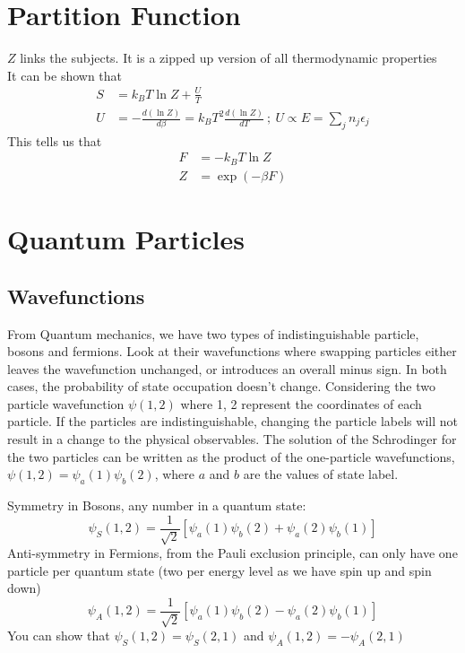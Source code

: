 \documentclass[a4paper, 11pt, normalem]{report}
\begin{document}
\section{Partition Function}
$Z$ links the subjects. It is a zipped up version of all thermodynamic properties \\
It can be shown that
\begin{align*}
    S &= k_B T\ln Z + \frac{U}{T} \\
    U &= -\frac{d(\ln Z)}{d\beta} = k_B T^2 \frac{d(\ln Z)}{dT} ~;~ U \propto E = \sum_{j} n_j \epsilon_j
\end{align*}
This tells us that
\begin{align*}
    F &= -k_B T\ln Z \\
    Z &= \exp(-\beta F)
\end{align*}

\section{Quantum Particles}

\subsection{Wavefunctions}
From Quantum mechanics, we have two types of indistinguishable particle, bosons and fermions.
Look at their wavefunctions where swapping particles either leaves the wavefunction unchanged, or introduces an overall minus sign.
In both cases, the probability of state occupation doesn't change. Considering the two particle wavefunction $\psi(1,2)$ where 1, 2 represent the coordinates of each particle.
If the particles are indistinguishable, changing the particle labels will not result in a change to the physical observables.
The solution of the Schrodinger for the two particles can be written as the product of the one-particle wavefunctions, $\psi(1,2) = \psi_{a}(1)\psi_{b}(2)$, where $a$ and $b$ are the values of state label.

Symmetry in Bosons, any number in a quantum state:
\begin{equation*}
    \psi_S (1,2) = \frac{1}{\sqrt{2}}[\psi_a(1)\psi_b(2) + \psi_a(2)\psi_b(1)]
\end{equation*}
Anti-symmetry in Fermions, from the Pauli exclusion principle, can only have one particle per quantum state (two per energy level as we have spin up and spin down)
\begin{equation*}
    \psi_A(1,2) = \frac{1}{\sqrt{2}}[\psi_a(1)\psi_b(2) - \psi_a(2)\psi_b(1)]
\end{equation*}
You can show that $\psi_S(1,2) = \psi_S(2,1)$ and $\psi_A(1,2) = -\psi_A(2,1)$
\end{document}
